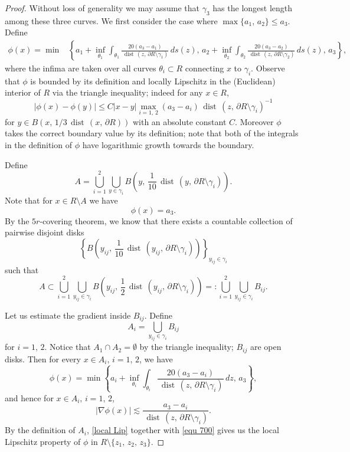 \documentclass[reqno,11pt]{amsart}
\def\dist{{\mathop\mathrm{\,dist\,}}}
\def\ls{\lesssim}
\numberwithin{equation}{section}
\theoremstyle{remark}
\begin{document}
\begin{proof}
Without loss of generality we may assume that $\gamma_3$ has the longest length among these three curves. 
We first consider the case where $\max\{a_1,\,a_2\}\le a_3$. Define 
\begin{align*}
\phi(x)=\min &\left\{a_1+\inf_{ \theta_1}\int_{ \theta_1}  \frac {20(a_3-a_1)}{\dist(z,\,\partial R\setminus \gamma_1)} \, ds(z),\, a_2+\inf_{ \theta_2}\int_{ \theta_2}  \frac {20(a_3-a_2)}{\dist(z,\,\partial R \setminus \gamma_2)} \, ds(z),\, a_3  \right\},
\end{align*}
where the infima are taken over all curves $\theta_i\subset R$ connecting $x$ to $ \gamma_{i}$. Observe 
that $\phi$ is bounded by its definition and locally Lipschitz in the (Euclidean) interior of $R$ via the triangle inequality; indeed for any $x\in R$,
$$|\phi(x) - \phi(y)|\le C |x-y|\max_{i=1,\,2} (a_3-a_i)\dist(z,\,\partial R\setminus \gamma_i)^{-1}$$ 
for $y\in B(x,\,1/3 \dist(x,\,\partial R))$ with an absolute constant $C$. Moreover $\phi$ takes the correct boundary value by its definition; note that both of the integrals in the definition of $\phi$ have logarithmic growth towards the boundary. 


Define
$$A=\bigcup_{i=1}^{2} \bigcup_{y\in \gamma_i} B\left(y,\, \frac 1 {10} \dist(y,\,\partial R\setminus \gamma_i)\right).$$
Note that for $x\in  R \setminus A $ we have 
\begin{equation}\label{equ 700}
\phi(x)=a_3.
\end{equation}
By the $5r$-covering theorem, we know that there exists a 
countable collection of pairwise disjoint disks 
$$\left\{B\left(y_{ij},\, \frac 1 {10} \dist(y_{ij},\,\partial R\setminus \gamma_i)\right)\right\}_{y_{ij}\in \gamma_i}$$ such that
$$A\subset \bigcup_{i=1}^{2} \bigcup_{y_{ij}\in \gamma_i}  B\left(y_{ij},\, \frac 1 {2} \dist(y_{ij},\,\partial R \setminus \gamma_i)\right)=:\bigcup_{i=1}^{2} \bigcup_{y_{ij}\in \gamma_i} B_{ij}. $$

Let us  estimate the gradient inside $B_{ij}$. 
Define
$$A_i=\bigcup_{y_{ij}\in \gamma_i} B_{ij}$$
for $i=1,\,2.$
Notice that $A_1\cap A_2=\emptyset$ by the triangle inequality; $B_{ij}$ are open disks.
Then for every $x\in A_i,\, i=1,\,2$, we have
$$\phi(x)= \min \left\{a_i+\inf_{ \theta_i}\int_{ \theta_i}  \frac {20(a_3-a_i)}{\dist(z,\,\partial R\setminus \gamma_i)} \, dz,\,a_3\right\},$$
and hence for $x\in A_i,\, i=1,\,2$, 
\begin{equation}\label{local Lip}
|\nabla \phi(x)|\ls  \frac { a_3-a_i }{\dist(z,\,\partial R\setminus \gamma_i)}.
\end{equation}
By the definition of $A_i$, \eqref{local Lip} together with \eqref{equ 700} gives us the local Lipschitz property of $\phi$ in $R \setminus\{z_1,\,z_2,\,z_3\}$.



\end{proof}
\end{document}
